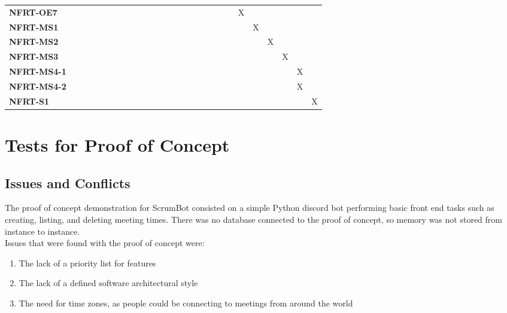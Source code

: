 \documentclass[12pt, titlepage]{article}
\begin{document}
\begin{landscape}
\begin{table}[H]
\begin{adjustbox}{width=\paperwidth}
\begin{tabular}{l|ccccccccccccccccccc}
        \textbf{NFRT-OE7}       & ~ & ~ & ~ & ~ & ~ & ~ & ~ & ~ & ~ & ~ & ~ & ~ & ~ & X & ~ & ~ & ~ & ~ & ~\\
        \textbf{NFRT-MS1}       & ~ & ~ & ~ & ~ & ~ & ~ & ~ & ~ & ~ & ~ & ~ & ~ & ~ & ~ & X & ~ & ~ & ~ & ~\\
        \textbf{NFRT-MS2}       & ~ & ~ & ~ & ~ & ~ & ~ & ~ & ~ & ~ & ~ & ~ & ~ & ~ & ~ & ~ & X & ~ & ~ & ~\\
        \textbf{NFRT-MS3}       & ~ & ~ & ~ & ~ & ~ & ~ & ~ & ~ & ~ & ~ & ~ & ~ & ~ & ~ & ~ & ~ & X & ~ & ~\\
        \textbf{NFRT-MS4-1}     & ~ & ~ & ~ & ~ & ~ & ~ & ~ & ~ & ~ & ~ & ~ & ~ & ~ & ~ & ~ & ~ & ~ & X & ~\\
        \textbf{NFRT-MS4-2}     & ~ & ~ & ~ & ~ & ~ & ~ & ~ & ~ & ~ & ~ & ~ & ~ & ~ & ~ & ~ & ~ & ~ & X & ~\\
        \textbf{NFRT-S1}        & ~ & ~ & ~ & ~ & ~ & ~ & ~ & ~ & ~ & ~ & ~ & ~ & ~ & ~ & ~ & ~ & ~ & ~ & X\\
    \end{tabular}
    \end{adjustbox}
    \label{Traceability Matrix: Non-Functional Requirement}
\end{table}
\end{landscape}

\section{Tests for Proof of Concept}

\subsection{Issues and Conflicts}
The proof of concept demonstration for ScrumBot consisted on a simple Python discord bot performing basic front end tasks such as creating, listing, and deleting meeting times. There was no database connected to the proof of concept, so memory was not stored from instance to instance.\\
\noindent Issues that were found with the proof of concept were:
\begin{enumerate}
    \item The lack of a priority list for features
    \item The lack of a defined software architectural style
    \item The need for time zones, as people could be connecting to meetings from around the world
\end{enumerate}
\end{document}
